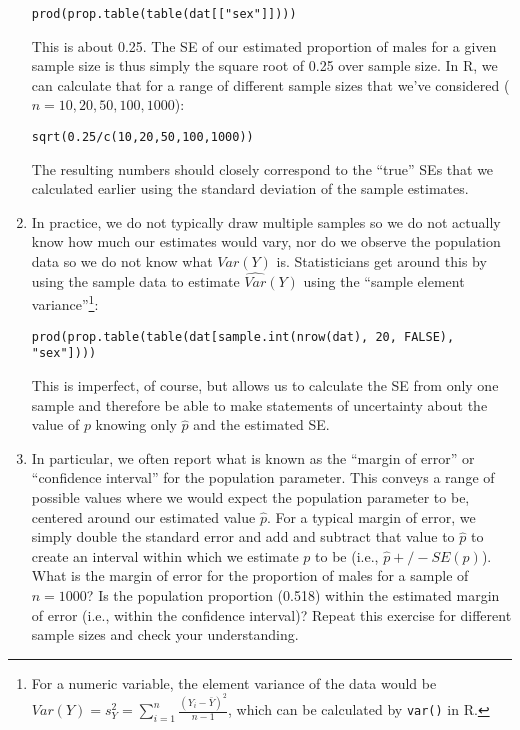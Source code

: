 \documentclass[a4paper,12pt]{article}
\begin{document}
\begin{enumerate}
\begin{verbatim}
prod(prop.table(table(dat[["sex"]])))
\end{verbatim}

\noindent This is about 0.25. The SE of our estimated proportion of males for a given sample size is thus simply the square root of 0.25 over sample size. In R, we can calculate that for a range of different sample sizes that we've considered ($n = {10,20,50,100,1000}$):

\begin{verbatim}
sqrt(0.25/c(10,20,50,100,1000))
\end{verbatim}

\noindent The resulting numbers should closely correspond to the ``true'' SEs that we calculated earlier using the standard deviation of the sample estimates.

\item In practice, we do not typically draw multiple samples so we do not actually know how much our estimates would vary, nor do we observe the population data so we do not know what $Var(Y)$ is. Statisticians get around this by using the sample data to estimate $\widehat{Var}(Y)$ using the ``sample element variance''\footnote{For a numeric variable, the element variance of the data would be $Var(Y) = s_Y^2 = \sum_{i=1}^{n} \frac{(Y_i - \bar{Y})^2}{n-1}$, which can be calculated by \texttt{var()} in R.}:

\begin{verbatim}
prod(prop.table(table(dat[sample.int(nrow(dat), 20, FALSE), "sex"])))
\end{verbatim}

\noindent This is imperfect, of course, but allows us to calculate the SE from only one sample and therefore be able to make statements of uncertainty about the value of $p$ knowing only $\hat{p}$ and the estimated SE.

\item In particular, we often report what is known as the ``margin of error'' or ``confidence interval'' for the population parameter. This conveys a range of possible values where we would expect the population parameter to be, centered around our estimated value $\hat{p}$. For a typical margin of error, we simply double the standard error and add and subtract that value to $\hat{p}$ to create an interval within which we estimate $p$ to be (i.e., $\hat{p} +/- SE(p)$). What is the margin of error for the proportion of males for a sample of $n=1000$? Is the population proportion (0.518) within the estimated margin of error (i.e., within the confidence interval)? Repeat this exercise for different sample sizes and check your understanding.


\end{enumerate}
\end{document}
